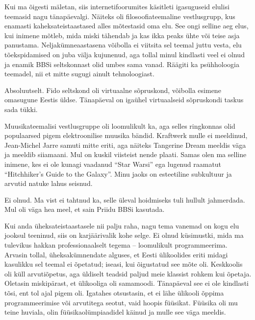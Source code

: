 
\label{sisu!inimeseks}Kui ma õigesti mäletan, siis internetifoorumites 
käsitleti igasuguseid elulisi teemasid nagu tänapäevalgi. 
Näiteks oli filosoofiateemaline vestlusgrupp, kus enamasti 
kaheksateistaastased alles mõtestasid oma elu. See ongi selline aeg 
elus, kui inimene mõtleb, mida miski tähendab ja kas ikka 
peaks ühte või teise asja panustama. Neljakümneaastasena 
võibolla ei viitsita sel teemal juttu vesta, elu 
tõekspidamised on juba välja kujunenud, aga tollal minul kindlasti veel ei 
olnud ja enamik 
BBSi seltskonnast olid umbes sama vanad. Räägiti ka psühholoogia teemadel, nii 
et mitte sugugi ainult tehnoloogiast. 


Absoluutselt. Fido seltskond oli virtuaalne sõpruskond, võibolla esimene 
omasugune 
Eestis üldse. Tänapäeval on igaühel virtuaalseid sõpruskondi taskus sada tükki.


Muusikateemalisi vestlusgruppe oli loomulikult ka, aga selles ringkonnas olid 
populaarsed pigem elektroonilise muusika bändid.  
Kraftwerk mulle ei meeldinud, Jean-Michel Jarre samuti 
mitte eriti, aga näiteks Tangerine Dream meeldis väga ja meeldib
siiamaani. Mul on kuskil viisteist nende plaati. 
Samas olen ma selline inimene, kes ei ole kunagi vaadanud \enquote{Star Warsi} ega 
lugenud raamatut \enquote{Hitchhiker's Guide to the Galaxy}. Minu jaoks on 
esteetiline subkultuur ja arvutid natuke lahus seisnud.


Ei olnud. Ma vist ei tahtnud ka, selle üleval hoidmiseks tuli hullult 
jahmerdada. 
Mul oli väga hea meel, et sain Priidu BBSi kasutada.


Kui anda üheksateistaastasele nii palju raha, nagu tema vanemad 
on kogu elu jooksul teeninud, siis on karjäärivalik kohe selge. Ei olnud 
küsimustki, mida ma 
tulevikus hakkan professionaalselt tegema -- loomulikult programmeerima. Arvasin 
tollal, 
üheksakümnendate alguses, et Eesti ülikoolides eriti midagi 
kasulikku sel teemal ei õpetatud; iseasi, kui õigustatud see mõte oli. 
Keskkoolis oli küll arvutiõpetus, aga üldiselt 
teadsid paljud meie klassist rohkem kui õpetaja. Oletasin
miskipärast, et ülikooliga oli samamoodi. Tänapäeval see ei ole kindlasti tõsi, 
ent tol ajal pigem oli. 
Igatahes otsustasin, et ei lähe ülikooli õppima 
programmeerimise või arvutitega seotut, vaid hoopis füüsikat. 
Füüsika oli mu teine huviala, olin 
füüsikaolümpiaadidel käinud ja mulle see väga meeldis. 

